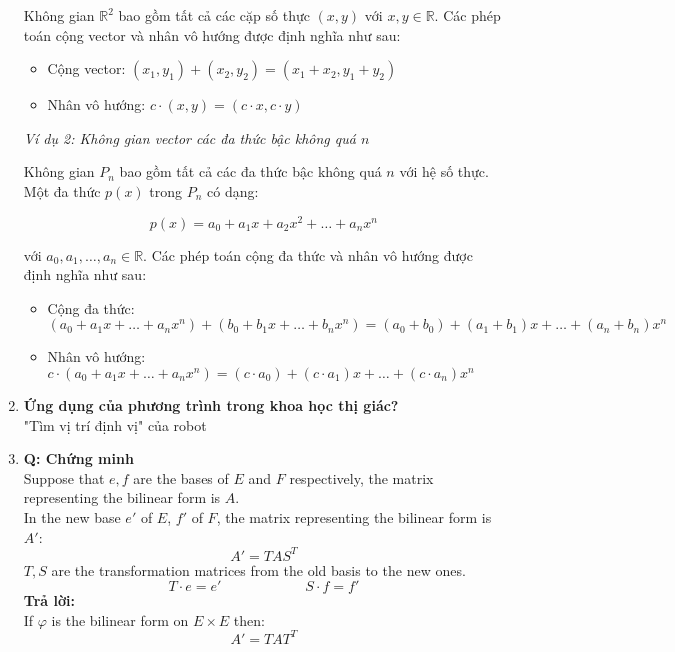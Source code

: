 \begin{enumerate}
    Không gian $\mathbb{R}^2$ bao gồm tất cả các cặp số thực $(x, y)$ với $x, y \in \mathbb{R}$. Các phép toán cộng vector và nhân vô hướng được định nghĩa như sau:
    
    \begin{itemize}
        \item Cộng vector: $(x_1, y_1) + (x_2, y_2) = (x_1 + x_2, y_1 + y_2)$
        \item Nhân vô hướng: $c \cdot (x, y) = (c \cdot x, c \cdot y)$
    \end{itemize}
    
    \textit{Ví dụ 2: Không gian vector các đa thức bậc không quá $n$}
    
    Không gian $P_n$ bao gồm tất cả các đa thức bậc không quá $n$ với hệ số thực. Một đa thức $p(x)$ trong $P_n$ có dạng:
    
    \[
    p(x) = a_0 + a_1 x + a_2 x^2 + \ldots + a_n x^n
    \]
    
    với $a_0, a_1, \ldots, a_n \in \mathbb{R}$. Các phép toán cộng đa thức và nhân vô hướng được định nghĩa như sau:
    
    \begin{itemize}
        \item Cộng đa thức: $(a_0 + a_1 x + \ldots + a_n x^n) + (b_0 + b_1 x + \ldots + b_n x^n) = (a_0 + b_0) + (a_1 + b_1) x + \ldots + (a_n + b_n) x^n$
        \item Nhân vô hướng: $c \cdot (a_0 + a_1 x + \ldots + a_n x^n) = (c \cdot a_0) + (c \cdot a_1) x + \ldots + (c \cdot a_n) x^n$
    \end{itemize}
    \item \textbf{Ứng dụng của phương trình trong khoa học thị giác?}\\
    "Tìm vị trí định vị" của robot
    \item \textbf{Q: Chứng minh}\\
    Suppose that $e, f$ are the bases of $E$ and $F$ respectively, the matrix representing the bilinear form is $A$.\\
    In the new base $e'$ of $E$, $f'$ of $F$, the matrix representing the bilinear form is $A'$:
    \begin{equation*}
        A' = T A S^T
    \end{equation*}
    $T, S$ are the transformation matrices from the old basis to the new ones.
    \[
    T \cdot e = e' \quad \quad \quad \quad \quad \quad S \cdot f = f'
    \]
    \textbf{Trả lời:}\\
    If $\varphi$ is the bilinear form on $E \times E$ then:
    \[
    A' = T A T^T
    \]
    

\end{enumerate}
